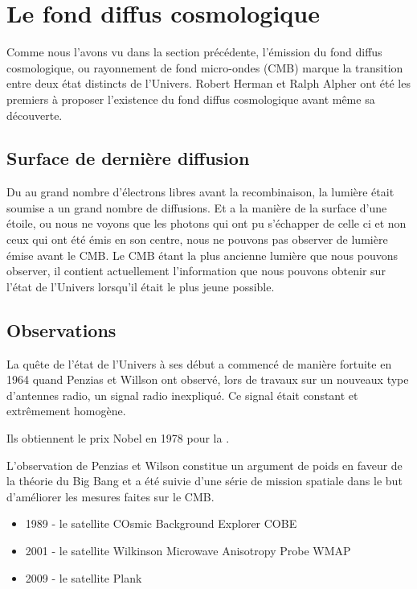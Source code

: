 \section{Le fond diffus cosmologique}
\label{sec:CMB}

Comme nous l'avons vu dans la section précédente, l’émission du fond diffus cosmologique, ou rayonnement de fond micro-ondes (\ac{CMB}) marque la transition entre deux état distincts de l'Univers.
Robert Herman et Ralph Alpher ont été les premiers à proposer l’existence du fond diffus cosmologique avant même sa découverte.

\subsection{Surface de dernière diffusion}

Du au grand nombre d'électrons libres avant la recombinaison, la lumière était soumise a un grand nombre de diffusions.
Et a la manière de la surface d'une étoile, ou nous ne voyons que les photons qui ont pu s’échapper de celle ci et non ceux qui ont été émis en son centre, nous ne pouvons pas observer de lumière émise avant le CMB.
Le CMB étant la plus ancienne lumière que nous pouvons observer, il contient actuellement l'information que nous pouvons obtenir sur l'état de l'Univers lorsqu'il était le plus jeune possible.

\subsection{Observations}

La quête de l'état de l'Univers à ses début a commencé de manière fortuite en 1964 quand Penzias et Willson ont observé, lors de travaux sur un nouveaux type d’antennes radio, un signal radio inexpliqué.
Ce signal était constant et extrêmement homogène. 

Ils obtiennent le prix Nobel en 1978 pour la \cite{PenziasWilsonNobel}.

L'observation de Penzias et Wilson constitue un argument de poids en faveur de la théorie du Big Bang et a été suivie d'une série de mission spatiale dans le but d'améliorer les mesures faites sur le \ac{CMB}.

\begin{itemize}
\item 1989 - le satellite COsmic Background Explorer COBE 
\item 2001 - le satellite Wilkinson Microwave Anisotropy Probe WMAP
\item 2009 - le satellite Plank
\end{itemize}

